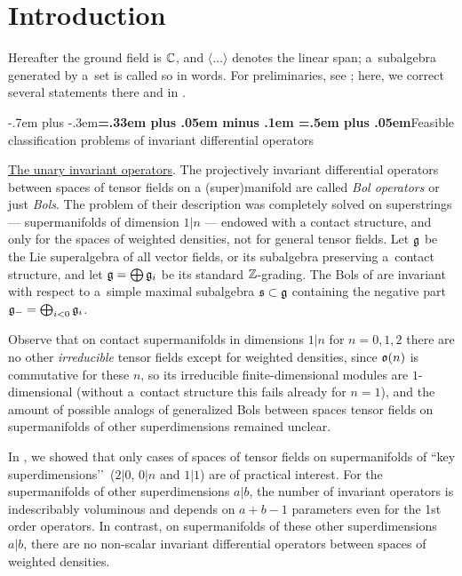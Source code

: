 \documentclass[12pt,a4paper]{amsart}
\makeatletter
\providecommand{\headspaces}{\spaceskip=.33em plus .05em minus .1em \xspaceskip=.5em plus .05em}
\def\subsection{\@startsection{subsection}{2}{0pt}{-1ex \@plus -.4ex \@minus -.2ex}%
  {-.7em plus -.3em}{\normalfont\normalsize\bfseries\boldmath\headspaces}}
\theoremstyle{thm}
\theoremstyle{definition}
\makeatother
\begin{document}

\thispagestyle{empty}
\setcounter{tocdepth}{3}
\tableofcontents

\section{Introduction} \label{Sgcr}
Hereafter the ground field is ${\mathbb C}$, and $\langle\dots\rangle$ denotes the linear span; a~subalgebra generated by a~set is called so in words. For preliminaries, see \cite{BLS1}; here, we correct several statements there and in \cite{BLO}.
%

\subsection{Feasible classification problems of invariant differential operators}{}~{}

\underline{The unary invariant operators}. The projectively invariant differential operators between spaces of tensor fields on a (super)manifold are called \textit{Bol operators} \cite{Bol} or just \textit{Bols}. The problem of their description was completely solved on superstrings  --- supermanifolds of dimension $1|n$ --- endowed with a contact structure, and only for the spaces of weighted densities, not for general tensor fields. Let ${\mathfrak{g}}$ be the Lie superalgebra of all vector fields, or its subalgebra preserving a~contact structure, and let ${\mathfrak{g}}=\bigoplus{\mathfrak{g}}_i$ be its standard ${\mathbb Z}$-grading. The Bols of \cite{BLS1} are invariant with respect to a~simple maximal subalgebra ${\mathfrak{s}}\subset{\mathfrak{g}}$ containing the negative part ${\mathfrak{g}}_-=\bigoplus_{i<0}{\mathfrak{g}}_i$. 

Observe that on contact supermanifolds in dimensions $1|n$ for $n=0, 1, 2$ there are no other \textit{irreducible} tensor fields except for weighted densities, since ${\mathfrak{o}}(n)$ is commutative for these $n$, so its irreducible finite-dimensional modules are $1$-dimensional (without a~contact structure this fails already for $n=1$), and the amount of possible analogs of generalized Bols between spaces tensor fields on supermanifolds of other superdimensions  remained unclear. 

In \cite{BLS2}, we showed that only cases of spaces of tensor fields on supermanifolds of ``key superdimensions\rq\rq\  ($2|0$, $0|n$ and $1|1$) are of practical interest. For the supermanifolds of other superdimensions $a|b$, the number of invariant operators is indescribably voluminous and depends on $a+b-1$ parameters even for the 1st order  operators. In contrast, on supermanifolds of these other superdimensions $a|b$, there are no non-scalar invariant differential operators between spaces of weighted densities. 
\end{document}
